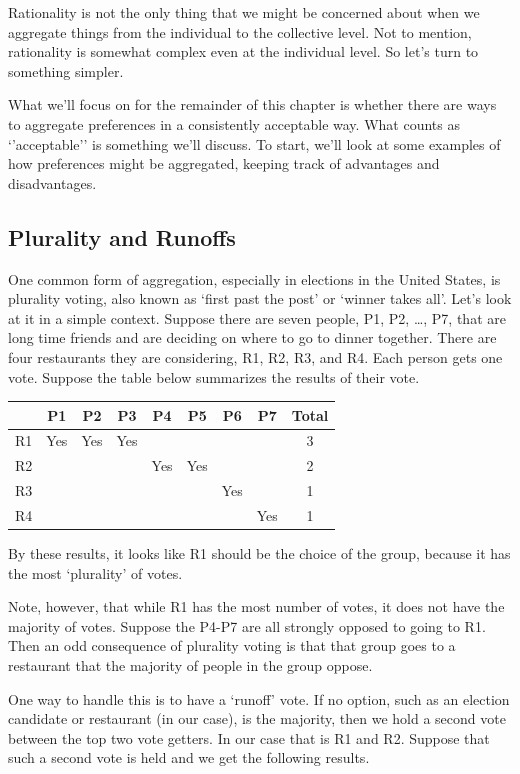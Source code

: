 \documentclass[]{tufte-book}
\begin{document}
Rationality is not the only thing that we might be concerned about when we aggregate things from the individual to the collective level. Not to mention, rationality is somewhat complex even at the individual level. So let's turn to something simpler.

What we'll focus on for the remainder of this chapter is whether there are ways to aggregate preferences in a consistently acceptable way. What counts as `'acceptable'' is something we'll discuss. To start, we'll look at some examples of how preferences might be aggregated, keeping track of advantages and disadvantages.

\hypertarget{plurality-and-runoffs}{%
\subsection{Plurality and Runoffs}\label{plurality-and-runoffs}}

One common form of aggregation, especially in elections in the United States, is plurality voting, also known as `first past the post' or `winner takes all'. Let's look at it in a simple context. Suppose there are seven people, P1, P2, \ldots, P7, that are long time friends and are deciding on where to go to dinner together. There are four restaurants they are considering, R1, R2, R3, and R4. Each person gets one vote. Suppose the table below summarizes the results of their vote.

\begin{longtable}[]{@{}lcccccccc@{}}
\toprule
& P1 & P2 & P3 & P4 & P5 & P6 & P7 & Total\tabularnewline
\midrule
\endhead
R1 & Yes & Yes & Yes & & & & & 3\tabularnewline
R2 & & & & Yes & Yes & & & 2\tabularnewline
R3 & & & & & & Yes & & 1\tabularnewline
R4 & & & & & & & Yes & 1\tabularnewline
\bottomrule
\end{longtable}

By these results, it looks like R1 should be the choice of the group, because it has the most `plurality' of votes.

Note, however, that while R1 has the most number of votes, it does not have the majority of votes. Suppose the P4-P7 are all strongly opposed to going to R1. Then an odd consequence of plurality voting is that that group goes to a restaurant that the majority of people in the group oppose.

One way to handle this is to have a `runoff' vote. If no option, such as an election candidate or restaurant (in our case), is the majority, then we hold a second vote between the top two vote getters. In our case that is R1 and R2. Suppose that such a second vote is held and we get the following results.
\end{document}
